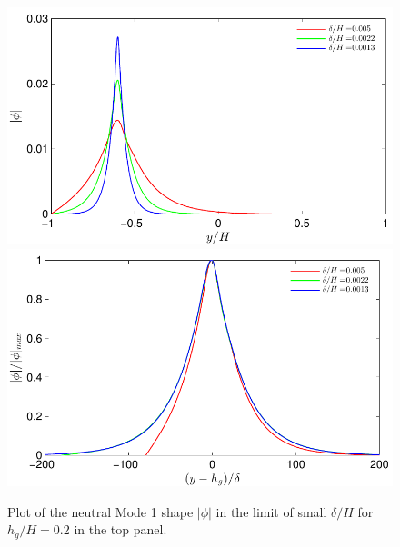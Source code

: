 \documentclass[12pt]{report}   %
\newcommand{\hg}{h_g}
\newcommand{\Rey}{{R}}
\newcommand{\Ndg}{\tilde{N}_g}
\begin{document}

\begin{figure}
{\includegraphics[scale=1.1]{Asymptotic_noshear}}\\
 \includegraphics[scale=1.1]{Asymptotic_noshear2}
\caption[Plot of the neutral Mode 1 shape $|\phi|$ in the limit of small $\delta/H$ for $\hg/H=0.2$]{
Plot of the neutral Mode 1 shape $|\phi|$ in the limit of small $\delta/H$ for $\hg/H=0.2$ in the top panel.
}
\end{figure}
\end{document}
